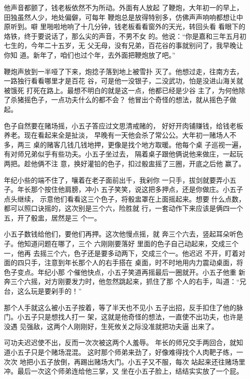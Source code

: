 他声音都颤了，钱老板依然不为所动。外面有人放起
了鞭炮，大年初一的早上，田独虽然人少，地处偏僻，可每年
鞭炮总是放得特别多，仿佛声声响响都想让中原听到。噼
里啪啦地响了十几分钟，钱老板看看窗外的天光，转回头看
看眼下的烙铁，终于要说话了，那么尖的声音，不男不女
的。他说：“你是嘉和三年五月初七生的，今年二十五岁，无
父无母，没有兄弟，百花谷的事就别问了，我早晚让你知
道。新年了，咱们也过个年，去外面把鞭炮放了吧。”
\newline

鞭炮声放到一半哑了下来，炮捻子落到地上被雪扑
灭了。他想过走，往南方去，一路独行看看哪里才是百花
谷，可是他一没银子，二没武功，怕是没进山海关就被饿死
打死在路上。最想不明白的就是这一点，他都已经是少谷
主了，为何他除了杀猪摇色子，一点功夫什么的都不会？
他冒出个奇怪的想法，就从摇色子做起。

色子自然要在赌场摇，小五子答应过文思清戒赌的，
好好开肉铺赚钱，给钱老板养老。现在看起来全是扯淡，
早晚有一天他会杀了常公公。大年初一赌场人不多，两三
桌的赌客几钱几钱地押，更像是找个地方取暖。他每个桌
子巡视一遍，有对师兄弟似乎有些功夫。小五子坐过去，
隔着桌子跟他俩说他来做庄，一起玩两把。趁他俩不注
意，换好灌铅的色子，扣过骰盅摇了三圈，开底之后他
赢了。

年纪小些的端不住了，嚷着在老子面前出千，我剁你
一只手，拔剑就要弄小五子。年长那个按住他肩膀，冲小
五子笑笑，说这把多押点，还是你做庄。小五子点头继续，
示意他们看看这三个色子，将骰盅罩在上面摇起来。想要
什么点数，都可以照口诀摇的，这次别是三个六，险胜就
行，一套动作下来应该是俩四一个五，开了骰盅，居然是三
个一。

小五子数钱给他们，要他们再押。这次他慢点摇，就
奔三个六去，竖起耳朵听色子。他知道问题在哪了，三个
六刚刚要落好 里面的色子自己动起来，交成三个一，他再
去摇三个六，色子还是要多动两下，交成三个一。他迟迟
不开，盯着对面的四只手，注意到年长那个人的右手搭在
桌面，时不时地用内力震动桌面，将色子变点。年纪小那
个催他快点，小五子笑道再摇最后一圈就开。小五子他重
新奔三个六摇，对方刚要发力时，他忽然跳起来，抓住了那
个人的右手，叫道：“兄台，这么玩是要剁手的！”

那个人手就这么被小五子按着，等了半天也不见小
五子出招，反手扣住了他的脉门。小五子只是想找人打一
架，这就是他奇怪的想法，一直使不出功夫，也许是没遇
见强敌，这两个人刚刚好，生死攸关之际没准就把功夫逼
出来了。

可功夫迟迟使不出，反而一次次被这两个人羞辱。
年长的师兄交手两回合，就知道小五子只是个赌场混混。
这时那个师弟来劲了，好像难得找个人肉靶子练，一次次
地把小五子放倒，再踢出赌场大门。小五子又不服，每次
站起来还往赌场里冲。最后一次这个师弟连给他三掌，又
坐在小五子脸上，结结实实放了一个屁。

